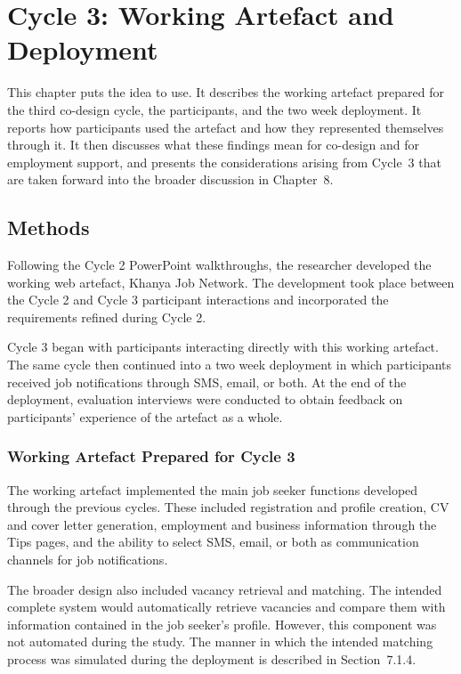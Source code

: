 \chapter{Cycle 3: Working Artefact and Deployment}

\begin{chapterintro}
This chapter puts the idea to use. It describes the working artefact prepared for the third co-design cycle, the participants, and the two week deployment. It reports how participants used the artefact and how they represented themselves through it. It then discusses what these findings mean for co-design and for employment support, and presents the considerations arising from Cycle~3 that are taken forward into the broader discussion in Chapter~8.
\end{chapterintro}


\section{Methods}

Following the Cycle 2 PowerPoint walkthroughs, the researcher developed the working web artefact, Khanya Job Network. The development took place between the Cycle 2 and Cycle 3 participant interactions and incorporated the requirements refined during Cycle 2.

Cycle 3 began with participants interacting directly with this working artefact. The same cycle then continued into a two week deployment in which participants received job notifications through SMS, email, or both. At the end of the deployment, evaluation interviews were conducted to obtain feedback on participants' experience of the artefact as a whole.


\subsection{Working Artefact Prepared for Cycle 3}

The working artefact implemented the main job seeker functions developed through the previous cycles. These included registration and profile creation, CV and cover letter generation, employment and business information through the Tips pages, and the ability to select SMS, email, or both as communication channels for job notifications.

The broader design also included vacancy retrieval and matching. The intended complete system would automatically retrieve vacancies and compare them with information contained in the job seeker's profile. However, this component was not automated during the study. The manner in which the intended matching process was simulated during the deployment is described in Section~7.1.4.


